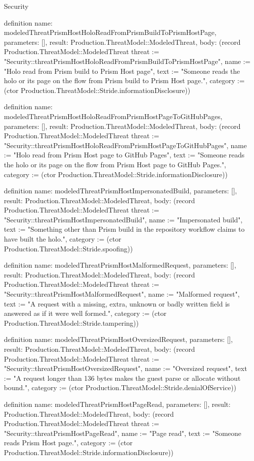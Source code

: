 \begin{lexlean}{Security}
\begin{semanticmodule}
definition{
  name: modeledThreatPrismHostHoloReadFromPrismBuildToPrismHostPage,
  parameters: [],
  result: Production.ThreatModel::ModeledThreat,
  body: (record Production.ThreatModel::ModeledThreat {threat := "Security::threatPrismHostHoloReadFromPrismBuildToPrismHostPage", name := "Holo read from Prism build to Prism Host page", text := "Someone reads the holo or its page on the flow from Prism build to Prism Host page.", category := (ctor Production.ThreatModel::Stride.informationDisclosure)})
}

definition{
  name: modeledThreatPrismHostHoloReadFromPrismHostPageToGitHubPages,
  parameters: [],
  result: Production.ThreatModel::ModeledThreat,
  body: (record Production.ThreatModel::ModeledThreat {threat := "Security::threatPrismHostHoloReadFromPrismHostPageToGitHubPages", name := "Holo read from Prism Host page to GitHub Pages", text := "Someone reads the holo or its page on the flow from Prism Host page to GitHub Pages.", category := (ctor Production.ThreatModel::Stride.informationDisclosure)})
}

definition{
  name: modeledThreatPrismHostImpersonatedBuild,
  parameters: [],
  result: Production.ThreatModel::ModeledThreat,
  body: (record Production.ThreatModel::ModeledThreat {threat := "Security::threatPrismHostImpersonatedBuild", name := "Impersonated build", text := "Something other than Prism build in the repository workflow claims to have built the holo.", category := (ctor Production.ThreatModel::Stride.spoofing)})
}

definition{
  name: modeledThreatPrismHostMalformedRequest,
  parameters: [],
  result: Production.ThreatModel::ModeledThreat,
  body: (record Production.ThreatModel::ModeledThreat {threat := "Security::threatPrismHostMalformedRequest", name := "Malformed request", text := "A request with a missing, extra, unknown or badly written field is answered as if it were well formed.", category := (ctor Production.ThreatModel::Stride.tampering)})
}

definition{
  name: modeledThreatPrismHostOversizedRequest,
  parameters: [],
  result: Production.ThreatModel::ModeledThreat,
  body: (record Production.ThreatModel::ModeledThreat {threat := "Security::threatPrismHostOversizedRequest", name := "Oversized request", text := "A request longer than 136 bytes makes the guest parse or allocate without bound.", category := (ctor Production.ThreatModel::Stride.denialOfService)})
}

definition{
  name: modeledThreatPrismHostPageRead,
  parameters: [],
  result: Production.ThreatModel::ModeledThreat,
  body: (record Production.ThreatModel::ModeledThreat {threat := "Security::threatPrismHostPageRead", name := "Page read", text := "Someone reads Prism Host page.", category := (ctor Production.ThreatModel::Stride.informationDisclosure)})
}


\end{semanticmodule}
\end{lexlean}
